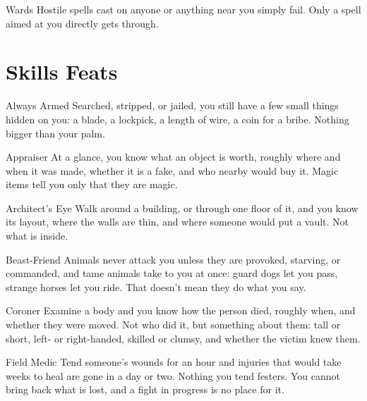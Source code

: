 \begin{feat}{Wards}
Hostile spells cast on anyone or anything near you simply fail. Only a
spell aimed at you directly gets through.
\end{feat}

\renewcommand{\realmaccent}{columnSkills}
\section{Skills Feats}

\begin{feat}{Always Armed}
Searched, stripped, or jailed, you still have a few small things hidden
on you: a blade, a lockpick, a length of wire, a coin for a bribe.
Nothing bigger than your palm.
\end{feat}

\begin{feat}{Appraiser}
At a glance, you know what an object is worth, roughly where and when it
was made, whether it is a fake, and who nearby would buy it. Magic items
tell you only that they are magic.
\end{feat}

\begin{feat}{Architect's Eye}
Walk around a building, or through one floor of it, and you know its
layout, where the walls are thin, and where someone would put a vault.
Not what is inside.
\end{feat}

\begin{feat}{Beast-Friend}
Animals never attack you unless they are provoked, starving, or
commanded, and tame animals take to you at once: guard dogs let you
pass, strange horses let you ride. That doesn't mean they do what you
say.
\end{feat}

\begin{feat}{Coroner}
Examine a body and you know how the person died, roughly when, and
whether they were moved. Not who did it, but something about them: tall
or short, left- or right-handed, skilled or clumsy, and whether the
victim knew them.
\end{feat}

\begin{feat}{Field Medic}
Tend someone's wounds for an hour and injuries that would take weeks to
heal are gone in a day or two. Nothing you tend festers. You cannot
bring back what is lost, and a fight in progress is no place for it.
\end{feat}

